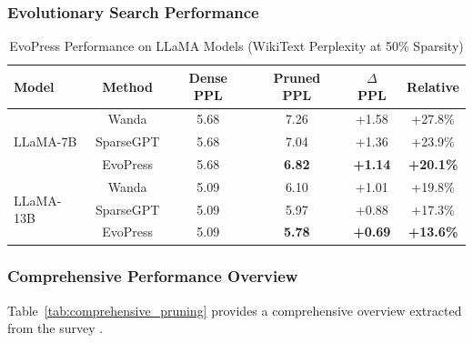 \subsubsection{Evolutionary Search Performance}

\begin{table}[H]
	\centering
	\caption{EvoPress Performance on LLaMA Models (WikiText Perplexity at 50\% Sparsity)}
	\label{tab:evopress_results}
	\begin{tabular}{@{}lccccc@{}}
		\toprule
		\textbf{Model} & \textbf{Method} & \textbf{Dense PPL} & \textbf{Pruned PPL} & \textbf{$\Delta$ PPL} & \textbf{Relative} \\ \midrule
		\multirow{3}{*}{LLaMA-7B} & Wanda & 5.68 & 7.26 & +1.58 & +27.8\% \\
		& SparseGPT & 5.68 & 7.04 & +1.36 & +23.9\% \\
		& EvoPress & 5.68 & \textbf{6.82} & \textbf{+1.14} & \textbf{+20.1\%} \\
		\midrule
		\multirow{3}{*}{LLaMA-13B} & Wanda & 5.09 & 6.10 & +1.01 & +19.8\% \\
		& SparseGPT & 5.09 & 5.97 & +0.88 & +17.3\% \\
		& EvoPress & 5.09 & \textbf{5.78} & \textbf{+0.69} & \textbf{+13.6\%} \\
		\bottomrule
	\end{tabular}
\end{table}

\subsubsection{Comprehensive Performance Overview}

Table~\ref{tab:comprehensive_pruning} provides a comprehensive overview extracted from the survey \cite{fernando2025}.

